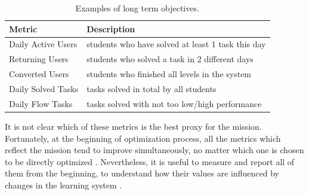 \begin{table}[htb]
\centering
\label{tbl:long-term-metrics}
\begin{tabular}{l l}
\toprule
Metric & Description \\
\midrule
Daily Active Users & students who have solved at least 1 task this day \\
Returning Users & students who solved a task in 2 different days \\
Converted Users & students who finished all levels in the system \\
Daily Solved Tasks & tasks solved in total by all students \\
Daily Flow Tasks & tasks solved with not too low/high performance \\
\bottomrule
\end{tabular}
\caption{Examples of long term objectives.}
\end{table}

It is not clear which of these metrics is the best proxy for the mission.
Fortunately, at the beginning of optimization process, all the metrics
which reflect the mission tend to improve simultaneously, no matter which one
is chosen to be directly optimized
\cite[][Rule 12]{google-ml-rules}.
Nevertheless, it is useful to measure and report all of them from the beginning,
to understand how their values are influenced by changes in the learning system
\cite[][Rule 2]{google-ml-rules}.





